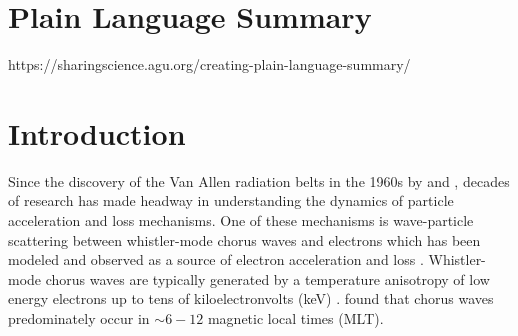 \documentclass[draft]{agujournal2019}
\begin{document}
\section{Plain Language Summary}
https://sharingscience.agu.org/creating-plain-language-summary/



%
%

%


%
%
%
%


\section{Introduction}
Since the discovery of the Van Allen radiation belts in the 1960s by  and , decades of research has made headway in understanding the dynamics of particle acceleration and loss mechanisms. One of these mechanisms is wave-particle scattering between whistler-mode chorus waves and electrons which has been modeled and observed as a source of electron acceleration and loss \cite{Abel1998_1, Meredith2002, Horne2003, Thorne2005, Millan2007, Bortnik2008}. Whistler-mode chorus waves are typically generated by a temperature anisotropy of low energy electrons up to tens of kiloelectronvolts (keV) \cite{Li2009b}.  found that chorus waves predominately occur in $\sim 6-12$ magnetic local times (MLT).
\end{document}
